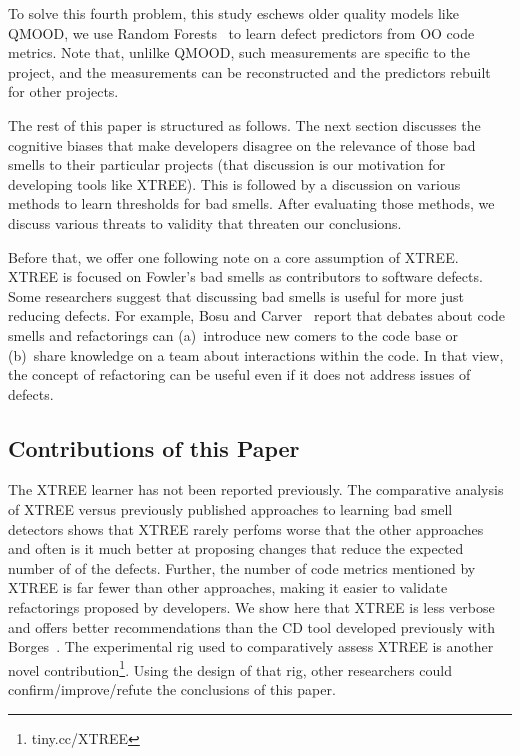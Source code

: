 \documentclass{sig-alternate}
\theoremstyle{break}
\begin{document}
To solve this fourth problem, this study  eschews
older quality models like QMOOD, we use
Random Forests~\cite{Breiman2001} to learn defect predictors
from OO code metrics.
Note that, unlilke QMOOD, such measurements 
  are specific to the project, and the measurements can be reconstructed and the predictors rebuilt for other projects.
  
 
 
The rest of this paper is structured as follows. 
The next section
discusses the cognitive
biases that make developers disagree on the relevance of those bad smells to
their particular projects
(that discussion is our motivation for developing 
tools like XTREE). This is followed by a discussion
on various methods to learn thresholds for bad smells.
After evaluating those methods, we discuss various threats to
validity that threaten our conclusions.


Before  that, we offer one following note on a
core assumption of XTREE.
XTREE   is focused on Fowler's bad smells
as contributors to software defects. Some researchers 
 suggest that discussing bad smells is useful for more just reducing defects. For example, Bosu and Carver~\cite{bosu13} report that
debates about code smells and refactorings can (a)~introduce new comers to the code base or (b)~share knowledge on a team
about interactions within the code. In that view, 
the concept of refactoring can be useful
even if it does not address issues of defects. 

\subsection{Contributions of this Paper }
The XTREE learner has not been reported
previously. 
The comparative analysis of XTREE
    versus previously published approaches to learning
    bad smell detectors shows
    that XTREE   rarely perfoms
      worse that the other approaches~\cite{Shatnawi10,Alves2010}
      and often is it   much better at proposing
      changes that reduce the expected
      number of of the defects. Further, the number
    of code metrics mentioned by XTREE is far
    fewer than other approaches, making it easier to validate refactorings proposed by
    developers. 
We
show here that XTREE is less verbose and offers better recommendations than the CD tool   developed previously with Borges~\cite{me12c}.
 The experimental rig
 used to comparatively assess
    XTREE is another novel contribution\footnote{tiny.cc/XTREE}. Using the design
    of that rig,
    other researchers could confirm/improve/refute
    the conclusions of this paper.
    
\end{document}
